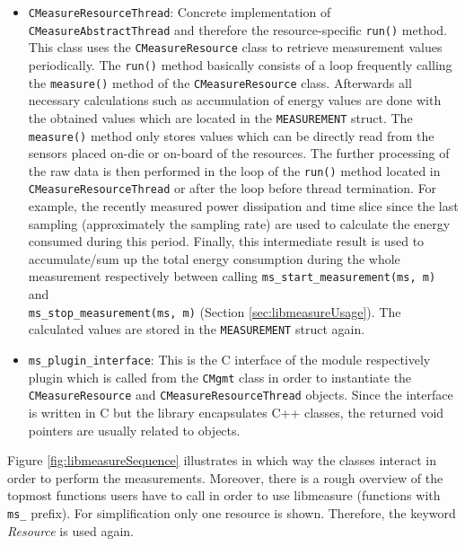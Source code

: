 \begin{description}
\begin{itemize}
		\item \texttt{CMeasureResourceThread}: Concrete implementation of\\ 
		\texttt{CMeasureAbstractThread} and therefore the resource-specific \texttt{run()} method. This class uses the \texttt{CMeasureResource} class to retrieve measurement values periodically. The \texttt{run()} method basically consists of a loop frequently calling the \texttt{measure()} method of the \texttt{CMeasureResource} class. Afterwards all necessary calculations such as accumulation of energy values are done with the obtained values which are located in the \texttt{MEASUREMENT} struct. The \texttt{measure()} method only stores values which can be directly read from the sensors placed on-die or on-board of the resources. The further processing of the raw data is then performed in the loop of the \texttt{run()} method located in \texttt{CMeasureResourceThread} or after the loop before thread termination. For example, the recently measured power dissipation and time slice since the last sampling (approximately the sampling rate) are used to calculate the energy consumed during this period. Finally, this intermediate result is used to accumulate/sum up the total energy consumption during the whole measurement respectively between calling \texttt{ms\_start\_measurement(ms, m)} and \\\texttt{ms\_stop\_measurement(ms, m)} (Section \ref{sec:libmeasureUsage}). The calculated values are stored in the \texttt{MEASUREMENT} struct again. 
		
		\item \texttt{ms\_plugin\_interface}: This is the C interface of the module respectively plugin which is called from the \texttt{CMgmt} class in order to instantiate the \texttt{CMeasureResource} and \texttt{CMeasureResourceThread} objects. Since the interface is written in C but the library encapsulates C++ classes, the returned void pointers are usually related to objects.
	\end{itemize}
\end{description}

Figure \ref{fig:libmeasureSequence} illustrates in which way the classes interact in order to perform the measurements. Moreover, there is a rough overview of the topmost functions users have to call in order to use libmeasure (functions with \texttt{ms\_} prefix). For simplification only one resource is shown. Therefore, the keyword \textit{Resource} is used again.\\

